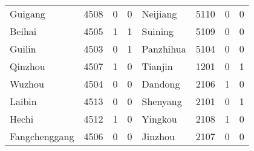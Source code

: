 \documentclass[12pt]{article}
\begin{document}
\begin{table}[!htb]
\begin{adjustbox}{width=\textwidth, totalheight=\baselineskip,keepaspectratio}
\begin{tabular}{llrlllrl}
       Guigang &  4508 &    0 &   0 &     Neijiang &  5110 &    0 &   0 \\
        Beihai &  4505 &    1 &   1 &      Suining &  5109 &    0 &   0 \\
        Guilin &  4503 &    0 &   1 &    Panzhihua &  5104 &    0 &   0 \\
       Qinzhou &  4507 &    1 &   0 &      Tianjin &  1201 &    0 &   1 \\
        Wuzhou &  4504 &    0 &   0 &      Dandong &  2106 &    1 &   0 \\
        Laibin &  4513 &    0 &   0 &     Shenyang &  2101 &    0 &   1 \\
         Hechi &  4512 &    1 &   0 &      Yingkou &  2108 &    1 &   0 \\
 Fangchenggang &  4506 &    0 &   0 &      Jinzhou &  2107 &    0 &   0 
\end{tabular}
\end{adjustbox}
\end{table}
\end{document}

